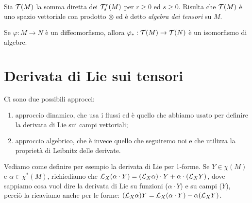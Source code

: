 \begin{definition} 
	Sia $\mathcal T(M)$ la somma diretta dei $\mathcal T_s^r(M)$ per $r\ge 0$ ed $s\ge 0$. Risulta che $\mathcal T(M)$ è uno spazio vettoriale con prodotto $\otimes$ ed è detto \emph{algebra dei tensori} su $M$.
\end{definition}

Se $\varphi:M\to N$ è un diffeomorfismo, allora $\varphi_*: \mathcal T(M) \to \mathcal T(N)$ è un isomorfismo di algebre.

\section{Derivata di Lie sui tensori}

Ci sono due possibili approcci:
\begin{enumerate}
	\item approccio dinamico, che usa i flussi ed è quello che abbiamo usato per definire la derivata di Lie sui campi vettoriali;
	\item approccio algebrico, che è invece quello che seguiremo noi e che utilizza la proprietà di Leibnitz delle derivate.
\end{enumerate}

\begin{example}
	Vediamo come definire per esempio la derivata di Lie per 1-forme.
	Se $Y\in\chi(M)$ e $\alpha\in\chi^*(M)$, richiediamo che $\mathcal L_X(\alpha \cdot Y) = (\mathcal L_X \alpha)\cdot Y + \alpha \cdot (\mathcal L_X Y)$, dove sappiamo cosa vuol dire la derivata di Lie su funzioni ($\alpha\cdot Y$) e su campi ($Y$), perciò la ricaviamo anche per le forme: $(\mathcal L_X\alpha)Y = \mathcal L_X(\alpha\cdot Y) - \alpha(\mathcal L_XY)$.
\end{example}

